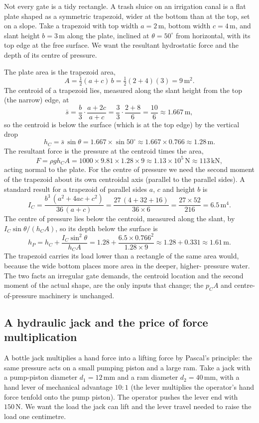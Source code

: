 Not every gate is a tidy rectangle. A trash sluice on an irrigation canal
is a flat plate shaped as a symmetric trapezoid, wider at the bottom than
at the top, set on a slope. Take a trapezoid with top width $a = 2\,\si{
\meter}$, bottom width $c = 4\,\si{\meter}$, and slant height $b = 3\,\si{
\meter}$ along the plate, inclined at $\theta = 50^{\circ}$ from horizontal,
with its top edge at the free surface. We want the resultant hydrostatic
force and the depth of its centre of pressure.

The plate area is the trapezoid area,
\[
A = \tfrac12 (a + c)\, b = \tfrac12 (2 + 4)(3) = 9\,\text{m}^2.
\]
The centroid of a trapezoid lies, measured along the slant height from the
top (the narrow) edge, at
\[
\bar{s} = \frac{b}{3}\cdot\frac{a + 2c}{a + c}
= \frac{3}{3}\cdot\frac{2 + 8}{6}
= \frac{10}{6} \approx 1.667\,\si{\meter},
\]
so the centroid is below the surface (which is at the top edge) by the
vertical drop
\[
h_C = \bar{s}\,\sin\theta = 1.667 \times \sin 50^{\circ}
\approx 1.667 \times 0.766 \approx 1.28\,\si{\meter}.
\]
The resultant force is the pressure at the centroid times the area,
\[
F = \rho g h_C A
= 1000 \times 9.81 \times 1.28 \times 9
\approx 1.13 \times 10^5\,\text{N}
\approx 113\,\text{kN},
\]
acting normal to the plate. For the centre of pressure we need the second
moment of the trapezoid about its own centroidal axis (parallel to the
parallel sides). A standard result for a trapezoid of parallel sides $a$,
$c$ and height $b$ is
\[
I_C = \frac{b^3\,(a^2 + 4ac + c^2)}{36\,(a + c)}
= \frac{27\,(4 + 32 + 16)}{36 \times 6}
= \frac{27 \times 52}{216}
= 6.5\,\text{m}^4.
\]
The centre of pressure lies below the centroid, measured along the slant,
by $I_C \sin\theta/(h_C A)$, so its depth below the surface is
\[
h_P = h_C + \frac{I_C \sin^2\theta}{h_C A}
= 1.28 + \frac{6.5 \times 0.766^2}{1.28 \times 9}
\approx 1.28 + 0.331 \approx 1.61\,\si{\meter}.
\]
The trapezoid carries its load lower than a rectangle of the same area
would, because the wide bottom places more area in the deeper, higher-
pressure water. The two facts an irregular gate demands, the centroid
location and the second moment of the actual shape, are the only inputs
that change; the $p_C A$ and centre-of-pressure machinery is unchanged.

\subsection{A hydraulic jack and the price of force multiplication}

A bottle jack multiplies a hand force into a lifting force by Pascal's
principle: the same pressure acts on a small pumping piston and a large
ram. Take a jack with a pump-piston diameter $d_1 = 12\,\si{\milli\meter}$
and a ram diameter $d_2 = 40\,\si{\milli\meter}$, with a hand lever of
mechanical advantage $10{:}1$ (the lever multiplies the operator's hand
force tenfold onto the pump piston). The operator pushes the lever end with
$150\,\text{N}$. We want the load the jack can lift and the lever travel
needed to raise the load one centimetre.

